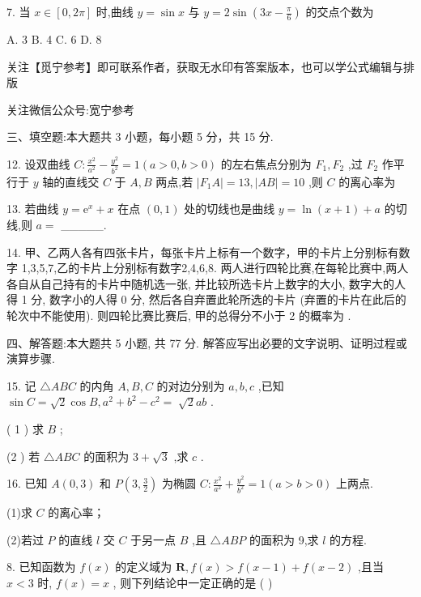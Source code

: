 \documentclass[10pt]{article}
\begin{document}
7. 当 \(x \in  \left\lbrack  {0,{2\pi }}\right\rbrack\) 时,曲线 \(y = \sin x\) 与 \(y = 2\sin \left( {{3x} - \frac{\pi }{6}}\right)\) 的交点个数为

A. 3 B. 4 C. 6 D. 8

关注【觅宁参考】即可联系作者，获取无水印有答案版本，也可以学公式编辑与排版

关注微信公众号:宽宁参考

三、填空题:本大题共 3 小题，每小题 5 分，共 15 分.

12. 设双曲线 \(C : \frac{{x}^{2}}{{a}^{2}} - \frac{{y}^{2}}{{b}^{2}} = 1\left( {a > 0,b > 0}\right)\) 的左右焦点分别为 \({F}_{1},{F}_{2}\) ,过 \({F}_{2}\) 作平行于 \(y\) 轴的直线交 \(C\) 于 \(A,B\) 两点,若 \(\left| {{F}_{1}A}\right|  = {13},\left| {AB}\right|  = {10}\) ,则 \(C\) 的离心率为

13. 若曲线 \(y = {\mathrm{e}}^{x} + x\) 在点 \(\left( {0,1}\right)\) 处的切线也是曲线 \(y = \ln \left( {x + 1}\right)  + a\) 的切线,则 \(a =\) \_\_\_\_\_.

14. 甲、乙两人各有四张卡片，每张卡片上标有一个数字，甲的卡片上分别标有数字 1,3,5,7,乙的卡片上分别标有数字2,4,6,8. 两人进行四轮比赛,在每轮比赛中,两人各自从自己持有的卡片中随机选一张, 并比较所选卡片上数字的大小, 数字大的人得 1 分, 数字小的人得 0 分, 然后各自弃置此轮所选的卡片 (弃置的卡片在此后的轮次中不能使用). 则四轮比赛比赛后, 甲的总得分不小于 2 的概率为 .

四、解答题:本大题共 5 小题, 共 77 分. 解答应写出必要的文字说明、证明过程或演算步骤.

15. 记 \(\bigtriangleup {ABC}\) 的内角 \(A,B,C\) 的对边分别为 \(a,b,c\) ,已知 \(\sin C = \sqrt{2}\cos B,{a}^{2} + {b}^{2} - {c}^{2} = \; \sqrt{2}{ab}\) .

( 1 ) 求 \(B\) ;

(2 ) 若 \(\bigtriangleup {ABC}\) 的面积为 \(3 + \sqrt{3}\) ,求 \(c\) .

16. 已知 \(A\left( {0,3}\right)\) 和 \(P\left( {3,\frac{3}{2}}\right)\) 为椭圆 \(C : \frac{{x}^{2}}{{a}^{2}} + \frac{{y}^{2}}{{b}^{2}} = 1\left( {a > b > 0}\right)\) 上两点.

(1)求 \(C\) 的离心率；

(2)若过 \(P\) 的直线 \(l\) 交 \(C\) 于另一点 \(B\) ,且 \(\bigtriangleup {ABP}\) 的面积为 9,求 \(l\) 的方程.

8. 已知函数为 \(f\left( x\right)\) 的定义域为 \(\mathbf{R},f\left( x\right)  > f\left( {x - 1}\right)  + f\left( {x - 2}\right)\) ,且当 \(x < 3\) 时, \(f\left( x\right)  = x\) , 则下列结论中一定正确的是 (   )
\end{document}
